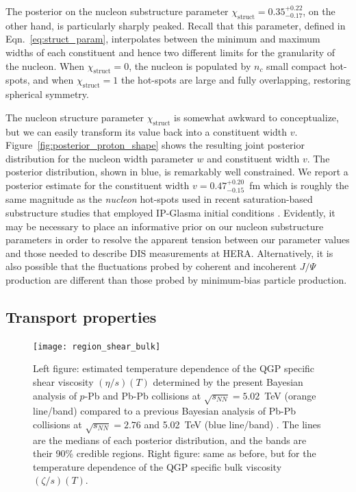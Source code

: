 \documentclass[aps,prc,reprint,amsmath,nofootinbib]{revtex4-1}
\newcommand{\sqrts}{\sqrt{s_{NN}}}
\newcommand{\X}{\chi_\text{struct}}
\begin{document}
The posterior on the nucleon substructure parameter $\X=0.35_{-0.17}^{+0.22}$, on the other hand, is particularly sharply peaked.
Recall that this parameter, defined in Eqn.~\eqref{eq:struct_param}, interpolates between the minimum and maximum widths of each constituent and hence
two different limits for the granularity of the nucleon.
When $\X=0$, the nucleon is populated by $n_c$ small compact hot-spots, and when $\X=1$ the hot-spots are large and fully overlapping, restoring spherical symmetry.

The nucleon structure parameter $\X$ is somewhat awkward to conceptualize, but we can easily transform its value back into a constituent width $v$.
Figure~\ref{fig:posterior_proton_shape} shows the resulting joint posterior distribution for the nucleon width parameter $w$ and constituent width $v$.
The posterior distribution, shown in blue, is remarkably well constrained.
We report a posterior estimate for the constituent width $v=0.47_{-0.15}^{+0.20}$~fm which is roughly the same magnitude as the \emph{nucleon} hot-spots used in recent saturation-based substructure studies that employed IP-Glasma initial conditions \cite{Schenke:2018fci}.
Evidently, it may be necessary to place an informative prior on our nucleon substructure parameters in order to resolve the apparent tension between our parameter values and those needed to describe DIS measurements at HERA.
Alternatively, it is also possible that the fluctuations probed by coherent and incoherent $J/\Psi$ production are different than those probed by minimum-bias particle production.

\subsection{Transport properties}

\begin{figure}
  \texttt{[image: region\_shear\_bulk]}
  \caption{
    \label{fig:region_shear_bulk}
    Left figure: estimated temperature dependence of the QGP specific shear viscosity $(\eta/s)(T)$ determined by the present Bayesian analysis of $p$-Pb and Pb-Pb collisions at $\sqrts=5.02$~TeV (orange line/band) compared to a previous Bayesian analysis of Pb-Pb collisions at $\sqrts=2.76$ and 5.02~TeV (blue line/band) \cite{Bernhard:2018hnz}.
    The lines are the medians of each posterior distribution, and the bands are their 90\% credible regions.
    Right figure: same as before, but for the temperature dependence of the QGP specific bulk viscosity $(\zeta/s)(T)$.
  }
\end{figure}
\end{document}
